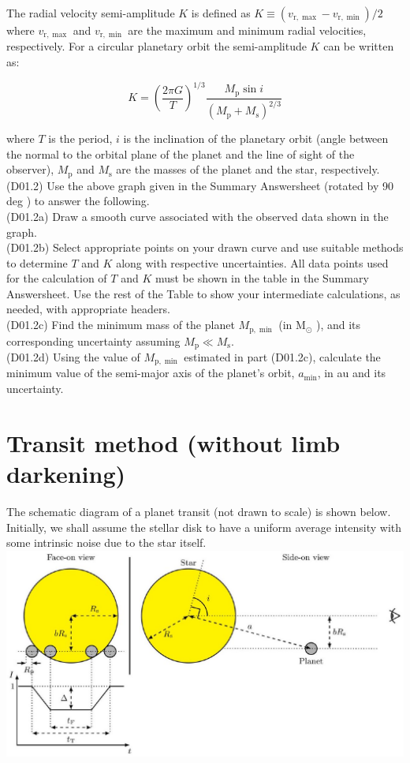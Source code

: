 \documentclass[10pt]{article}
\begin{document}
    The radial velocity semi-amplitude $K$ is defined as $K \equiv\left(v_{\mathrm{r}, \max }-v_{\mathrm{r}, \min }\right) / 2$ where $v_{\mathrm{r}, \max }$ and $v_{\mathrm{r}, \min }$ are the maximum and minimum radial velocities, respectively. For a circular planetary orbit the semi-amplitude $K$ can be written as:
    
    $$
    K=\left(\frac{2 \pi G}{T}\right)^{1 / 3} \frac{M_{\mathrm{p}} \sin i}{\left(M_{\mathrm{p}}+M_{\mathrm{s}}\right)^{2 / 3}}
    $$
    
    where $T$ is the period, $i$ is the inclination of the planetary orbit (angle between the normal to the orbital plane of the planet and the line of sight of the observer), $M_{\mathrm{p}}$ and $M_{\mathrm{s}}$ are the masses of the planet and the star, respectively.\\
    (D01.2) Use the above graph given in the Summary Answersheet (rotated by 90 deg ) to answer the following.\\
    (D01.2a) Draw a smooth curve associated with the observed data shown in the graph.\\
    (D01.2b) Select appropriate points on your drawn curve and use suitable methods to determine $T$ and $K$ along with respective uncertainties. All data points used for the calculation of $T$ and $K$ must be shown in the table in the Summary Answersheet. Use the rest of the Table to show your intermediate calculations, as needed, with appropriate headers.\\
    (D01.2c) Find the minimum mass of the planet $M_{\mathrm{p}, \min }$ (in $\mathrm{M}_{\odot}$ ), and its corresponding uncertainty assuming $M_{\mathrm{p}} \ll M_{\mathrm{s}}$.\\
    (D01.2d) Using the value of $M_{\mathrm{p}, \min }$ estimated in part (D01.2c), calculate the minimum value of the semi-major axis of the planet's orbit, $a_{\min }$, in au and its uncertainty.
    
    \section*{Transit method (without limb darkening)}
    The schematic diagram of a planet transit (not drawn to scale) is shown below. Initially, we shall assume the stellar disk to have a uniform average intensity with some intrinsic noise due to the star itself.\\
    \includegraphics[max width=\textwidth, center]{2025_08_23_9a7c688c47c330d7bfc8g-2}
    
\end{document}
